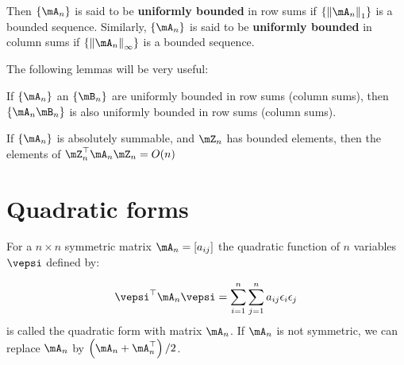 Then $\left\lbrace \mA_n \right\rbrace$ is said to be \textbf{uniformly bounded} in row sums if $\left\lbrace\left\|\mA_n\right\|_1\right\rbrace$ is a bounded sequence. Similarly, $\left\lbrace \mA_n \right\rbrace$ is said to be \textbf{uniformly bounded} in column sums if $\left\lbrace\left\|\mA_n\right\|_{\infty}\right\rbrace$ is a bounded sequence. 

The following lemmas will be very useful:

\begin{lemma}\label{lemma:bounded_lemma}
If $\left\lbrace \mA_n \right\rbrace$ an $\left\lbrace \mB_n \right\rbrace$ are uniformly bounded in row sums (column sums), then $\left\lbrace \mA_n \mB_n\right\rbrace$ is also uniformly bounded in row sums (column sums).
\end{lemma}

\begin{lemma}\label{lemma:bounde_ON}
If $\left\lbrace \mA_n \right\rbrace$ is absolutely summable, and $\mZ_n$ has bounded elements, then the elements of $\mZ_n^\top \mA_n\mZ_n = O(n)$
\end{lemma}


\section{Quadratic forms}

\begin{definition}\label{def:quad-form}
For a $n\times n$ symmetric matrix $\mA_n=\left[a_{ij}\right]$ the quadratic function of $n$ variables $\vepsi$ defined by:

\begin{equation}
\vepsi^\top \mA_n \vepsi = \sum_{i = 1}^n\sum_{j = 1}^na_{ij}\epsilon_i\epsilon_j
\end{equation}
%
is called the quadratic form with matrix $\mA_n$.  If $\mA_n$ is not symmetric, we can replace $\mA_n$ by $\left(\mA_n + \mA_n^\top\right)/2$.
\end{definition}

